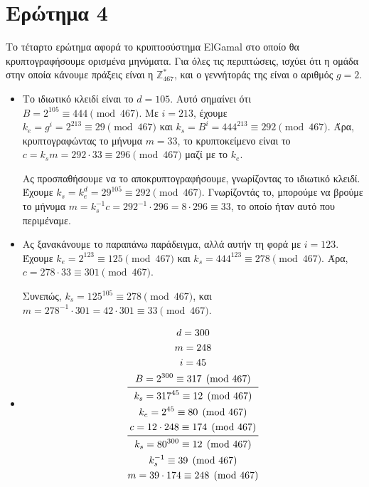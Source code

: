 \documentclass{article}
\begin{document}
\section*{Ερώτημα 4}

Το τέταρτο ερώτημα αφορά το κρυπτοσύστημα ElGamal στο οποίο θα κρυπτογραφήσουμε ορισμένα μηνύματα. Για όλες τις περιπτώσεις, ισχύει ότι η ομάδα στην οποία κάνουμε πράξεις είναι η $\mathbb{Z}_{467}^*$, και ο γεννήτοράς της είναι ο αριθμός $g = 2$.

\begin{itemize}
    \item Το ιδιωτικό κλειδί είναι το $d = 105$. Αυτό σημαίνει ότι $B = 2^{105} \equiv 444 \pmod{467}$. Με $i = 213$, έχουμε $k_e = g^i = 2^{213} \equiv 29 \pmod{467}$ και $k_s = B^i = 444^{213} \equiv 292 \pmod{467}$. Άρα, κρυπτογραφώντας το μήνυμα $m = 33$, το κρυπτοκείμενο είναι το $c = k_sm = 292 \cdot 33 \equiv 296 \pmod{467}$ μαζί με το $k_e$.

    Ας προσπαθήσουμε να το αποκρυπτογραφήσουμε, γνωρίζοντας το ιδιωτικό κλειδί. Έχουμε $k_s = k_e^d = 29^{105} \equiv 292 \pmod{467}$. Γνωρίζοντάς το, μπορούμε να βρούμε το μήνυμα $m = k_s^{-1}c = 292^{-1} \cdot 296 = 8 \cdot 296 \equiv 33$, το οποίο ήταν αυτό που περιμέναμε.

    \item Ας ξανακάνουμε το παραπάνω παράδειγμα, αλλά αυτήν τη φορά με $i = 123$. Έχουμε $k_e = 2^{123} \equiv 125 \pmod{467}$ και $k_s = 444^{123} \equiv 278 \pmod{467}$. Άρα, $c = 278 \cdot 33 \equiv 301 \pmod{467}$.

    Συνεπώς, $k_s = 125^{105} \equiv 278 \pmod{467}$, και $m = 278^{-1} \cdot 301 = 42 \cdot 301 \equiv 33 \pmod{467}$.

    \item
    \begin{gather*}
        d = 300 \\
        m = 248 \\
        i = 45 \\
        B = 2^{300} \equiv 317 \pmod{467} \\
        \midrule
        k_s = 317^{45} \equiv 12 \pmod{467} \\
        k_e = 2^{45} \equiv 80 \pmod{467} \\
        c = 12 \cdot 248 \equiv 174 \pmod{467} \\
        \midrule
        k_s = 80^{300} \equiv 12 \pmod{467} \\
        k_s^{-1} \equiv 39 \pmod{467} \\
        m = 39 \cdot 174 \equiv 248 \pmod{467}
    \end{gather*}


\end{itemize}
\end{document}
